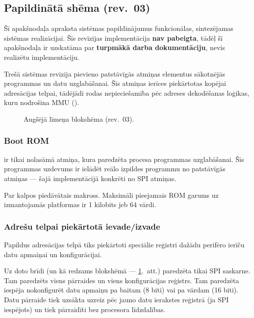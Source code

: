 \subsection{Papildinātā shēma (rev.~03)}
Šī apakšnodaļa apraksta sistēmas papildinājumus funkcionālas, sintezējamas
sistēmas realizācijai. Šīs revīzijas implementācija \textbf{nav pabeigta},
tādēļ šī apakšnodaļa ir uzskatāma par \textbf{turpmākā darba dokumentāciju},
nevis realizētu implementāciju.

Trešā sistēmas revīzija pievieno patstāvīgās atmiņas elementus sākotnējās
programmas un datu uzglabāšanai. Šīs atmiņas ierīces piekārtotas kopējai
adresācijas telpai, tādējādi rodas nepieciešamība pēc adreses dekodēšanas
loģikas, kuru nodrošina MMU ().

\begin{figure}[bhp]
	\centering
	\def\svgscale{1.25}
	{}
	\caption{Augšējā līmeņa blokshēma (rev.~03).}
	\label{fig:top-rev3}
\end{figure}

\subsubsection{Boot ROM}
	 ir tikai nolasāmā atmiņa, kura paredzēta
	 procesa programmas uzglabāšanai.
	Šīs programmas uzdevums ir ielādēt reālo izpildes programmu no
	patstāvīgās atmiņas — šajā implementācijā konkrēti 
	no SPI  atmiņas.
	
	Par  kalpos  piedāvātais
	 makross.
	Maksimāli pieejamais ROM garums uz izmantojamās platformas ir
	1 kilobits jeb 64 vārdi.

\subsubsection{Adrešu telpai piekārtotā ievade/izvade}
	Papildus adresācijas telpā tiks piekārtoti speciālie reģistri dažādu
	perifēro ierīču datu apmaiņai un konfigurācijai.
	
	Uz doto brīdi (un kā redzams blokshēmā — \ref{fig:top-rev3}.~att.)
	paredzēta tikai SPI saskarne. Tam paredzēts viens pārraides un viens
	konfigurācijas reģistrs. Tam paredzēta iespēja nokonfigurēt datu
	apmaiņu pa baitam (8 biti) vai pa vārdam (16 biti). Datu pārraide tiek
	uzsākta uzreiz pēc jauno datu ierakstes reģistrā (ja SPI iespējots) un
	tiek pārraidīti bez procesora līdzdalības.
	
